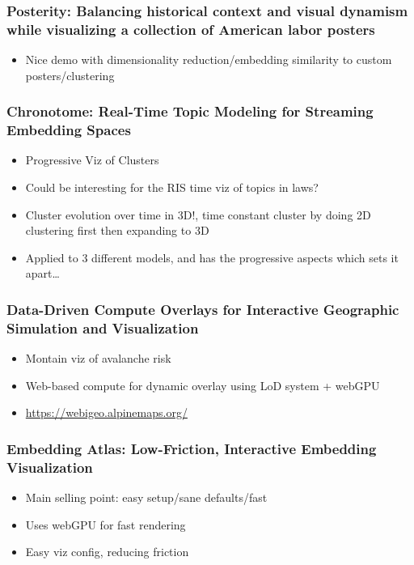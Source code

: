 \documentclass[a4paper]{article}
\begin{document}
\subsubsection{Posterity: Balancing historical context and visual dynamism while visualizing a collection of American labor posters}
\begin{itemize}
    \item Nice demo with dimensionality reduction/embedding similarity to custom posters/clustering
\end{itemize}
\subsubsection{Chronotome: Real-Time Topic Modeling for Streaming Embedding Spaces}
\begin{itemize}
    \item Progressive Viz of Clusters
    \item Could be interesting for the RIS time viz of topics in laws?
    \item Cluster evolution over time in 3D!, time constant cluster by doing 2D clustering first then expanding to 3D
    \item Applied to 3 different models, and has the progressive aspects which sets it apart\dots
\end{itemize}
\subsubsection{Data-Driven Compute Overlays for Interactive Geographic Simulation and Visualization}
\begin{itemize}
    \item Montain viz of avalanche risk
    \item Web-based compute for dynamic overlay using LoD system + webGPU
    \item \url{https://webigeo.alpinemaps.org/}
\end{itemize}
\subsubsection{Embedding Atlas: Low-Friction, Interactive Embedding Visualization}
\begin{itemize}
    \item Main selling point: easy setup/sane defaults/fast
    \item Uses webGPU for fast rendering
    \item Easy viz config, reducing friction
\end{itemize}
\end{document}

